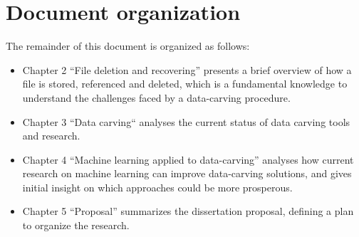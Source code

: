 \section{Document organization}
The remainder of this document is organized as follows:

\begin{itemize}
    \item Chapter 2 ``File deletion and recovering'' presents a brief overview of how a file is stored, referenced and deleted, which is a fundamental knowledge to understand the challenges faced by a data-carving procedure.

    \item Chapter 3 ``Data carving`` analyses the current status of data carving tools and research.

    \item Chapter 4 ``Machine learning applied to data-carving'' analyses how current research on machine learning can improve data-carving solutions, and gives initial insight on which approaches could be more prosperous.

    \item Chapter 5 ``Proposal'' summarizes the dissertation proposal, defining a plan to organize the research.
\end{itemize}

